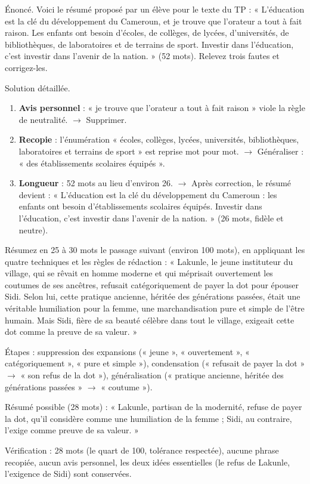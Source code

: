 \documentclass[11pt]{article}
\begin{document}
\begin{exoresolu}
Énoncé. Voici le résumé proposé par un élève pour le texte du TP : « L'éducation est la clé du développement du Cameroun, et je trouve que l'orateur a tout à fait raison. Les enfants ont besoin d'écoles, de collèges, de lycées, d'universités, de bibliothèques, de laboratoires et de terrains de sport. Investir dans l'éducation, c'est investir dans l'avenir de la nation. » (52 mots). Relevez trois fautes et corrigez-les.

\tcblower
Solution détaillée.
\begin{enumerate}
\item \textbf{Avis personnel} : « je trouve que l'orateur a tout à fait raison » viole la règle de neutralité. $\to$ Supprimer.
\item \textbf{Recopie} : l'énumération « écoles, collèges, lycées, universités, bibliothèques, laboratoires et terrains de sport » est reprise mot pour mot. $\to$ Généraliser : « des établissements scolaires équipés ».
\item \textbf{Longueur} : 52 mots au lieu d'environ 26. $\to$ Après correction, le résumé devient : « L'éducation est la clé du développement du Cameroun : les enfants ont besoin d'établissements scolaires équipés. Investir dans l'éducation, c'est investir dans l'avenir de la nation. » (26 mots, fidèle et neutre).
\end{enumerate}
\end{exoresolu}

\begin{exercice}
Résumez en 25 à 30 mots le passage suivant (environ 100 mots), en appliquant les quatre techniques et les règles de rédaction : « Lakunle, le jeune instituteur du village, qui se rêvait en homme moderne et qui méprisait ouvertement les coutumes de ses ancêtres, refusait catégoriquement de payer la dot pour épouser Sidi. Selon lui, cette pratique ancienne, héritée des générations passées, était une véritable humiliation pour la femme, une marchandisation pure et simple de l'être humain. Mais Sidi, fière de sa beauté célèbre dans tout le village, exigeait cette dot comme la preuve de sa valeur. »
\end{exercice}

\begin{corrige}
Étapes : suppression des expansions (« jeune », « ouvertement », « catégoriquement », « pure et simple »), condensation (« refusait de payer la dot » $\to$ « son refus de la dot »), généralisation (« pratique ancienne, héritée des générations passées » $\to$ « coutume »).

Résumé possible (28 mots) : « Lakunle, partisan de la modernité, refuse de payer la dot, qu'il considère comme une humiliation de la femme ; Sidi, au contraire, l'exige comme preuve de sa valeur. »

Vérification : 28 mots (le quart de 100, tolérance respectée), aucune phrase recopiée, aucun avis personnel, les deux idées essentielles (le refus de Lakunle, l'exigence de Sidi) sont conservées.
\end{corrige}
\end{document}
